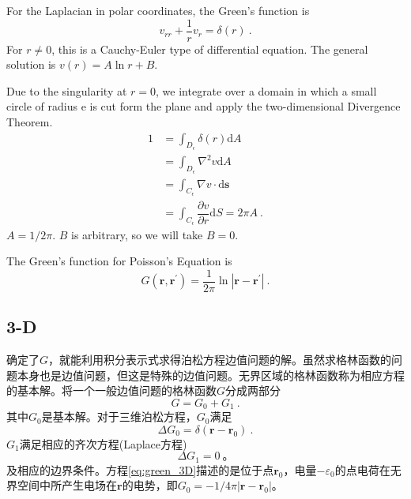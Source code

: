 \documentclass[11pt,a4paper]{article}
\renewcommand{\vec}[1]{\boldsymbol{#1}}
\newcommand{\dif}{\mathrm{d}}
\begin{document}
For the Laplacian in polar coordinates, the Green's function is
\begin{equation}
v_{rr} + \dfrac{1}{r} v_r = \delta(r) ~.
\end{equation}
For $r \neq 0$, this is a Cauchy-Euler type of differential equation. The general solution is $v(r) = A \ln r + B$.

Due to the singularity at $r = 0$, we integrate over a domain in which a small circle of radius e is cut form the plane and apply the two-dimensional Divergence Theorem. 
\begin{align}
\nonumber 1 &= \int_{D_\epsilon} \delta(r) \dif A \\
\nonumber &= \int_{D_\epsilon} \nabla^2 v \dif A \\
\nonumber &= \int_{C_\epsilon} \nabla v\cdot \dif \vec{s} \\
&= \int_{C_\epsilon} \dfrac{\partial v}{\partial r}\dif S = 2\pi A ~.
\end{align}
$A = 1/2\pi$.  $B$ is arbitrary, so we will take $B = 0$.

The Green's function for Poisson's Equation is
\begin{equation}
G(\vec{r}, \vec{r}^\prime) = \dfrac{1}{2\pi} \ln |\vec{r} - \vec{r}^\prime| ~.
\end{equation}





























\subsection{3-D}
\cite{2010数学物理方法, 2015数学物理方法, 2006数学物理方法} 确定了$G$，就能利用积分表示式求得泊松方程边值问题的解。虽然求格林函数的问题本身也是边值问题，但这是特殊的边值问题。无界区域的格林函数称为相应方程的基本解。将一个一般边值问题的格林函数$G$分成两部分
\begin{equation}
G = G_0 +G_1 ~.
\end{equation}
其中$G_0$是基本解。对于三维泊松方程，$G_0$满足
\begin{equation}
\Delta G_0 = \delta(\vec{r} -\vec{r}_0) ~.
\label{eq:green_3D}
\end{equation}
$G_1$满足相应的齐次方程(Laplace方程)
\begin{equation}
\Delta G_1 = 0 ~。
\end{equation}
及相应的边界条件。方程\ref{eq:green_3D}描述的是位于点$\vec{r}_0$，电量$-\varepsilon_0$的点电荷在无界空间中所产生电场在$\vec{r}$的电势，即$G_0 = -1/4\pi|\vec{r} -\vec{r}_0|$。
\end{document}

